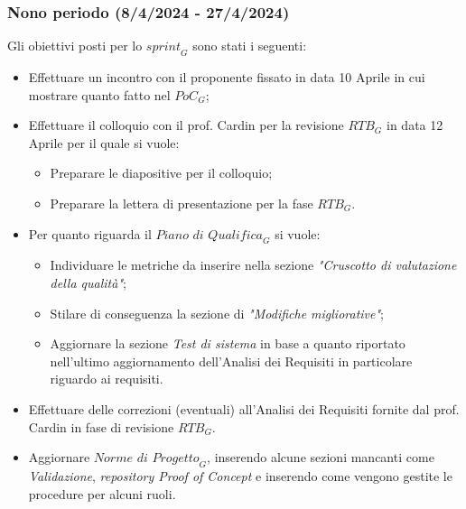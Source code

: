 \subsubsection{Nono periodo (8/4/2024 - 27/4/2024)}
Gli obiettivi posti per lo $\textit{sprint}_G$ sono stati i seguenti:
\begin{itemize}
    \item Effettuare un incontro con il proponente fissato in data 10 Aprile in cui mostrare quanto fatto nel $\textit{PoC}_G$;
    \item Effettuare il colloquio con il prof. Cardin per la revisione $\textit{RTB}_G$ in data 12 Aprile per il quale si vuole:
    \begin{itemize}
        \item Preparare le diapositive per il colloquio;
        \item Preparare la lettera di presentazione per la fase $\textit{RTB}_G$.
    \end{itemize}
    \item Per quanto riguarda il $\textit{Piano di Qualifica}_G$ si vuole:
    \begin{itemize}
        \item Individuare le metriche da inserire nella sezione \emph{"Cruscotto di valutazione della qualità"};
        \item Stilare di conseguenza la sezione di \emph{"Modifiche migliorative"};
        \item Aggiornare la sezione \emph{Test di sistema} in base a quanto riportato nell'ultimo aggiornamento dell'Analisi dei Requisiti in particolare riguardo ai requisiti.
    \end{itemize}
    \item Effettuare delle correzioni (eventuali) all'Analisi dei Requisiti fornite dal prof. Cardin in fase di revisione $\textit{RTB}_G$.
    \item Aggiornare $\textit{Norme di Progetto}_G$, inserendo alcune sezioni mancanti come \emph{Validazione}, \emph{repository Proof of Concept} e inserendo come vengono gestite le procedure per alcuni ruoli.
\end{itemize}
